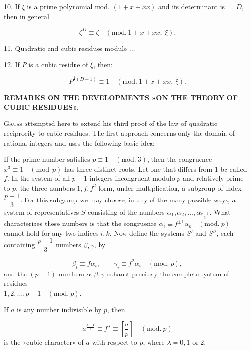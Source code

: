 10. If $\xi$ is a prime polynomial mod. $(1+x+xx)$ and its determinant is $=D$,
then in general

\[
\zeta^D \equiv \zeta \quad(\mathrm{mod.}\ 1+x+xx,\ \xi).
\]

11. Quadratic and cubic residues modulo $\ldots$

12. If $P$ is a cubic residue of $\xi$, then:

\[
P^{\frac{1}{3}(D-1)} \equiv 1 \quad(\mathrm{mod.}\ 1+x+xx,\ \xi).
\]



\begingroup\small
\begin{center}
\textbf{REMARKS ON THE DEVELOPMENTS »ON THE THEORY OF CUBIC} 
\textbf{RESIDUES«.}
\end{center}
\noindent\hspace*{\parindent}\textsc{Gauss} attempted here to extend his third proof of
the law of quadratic reciprocity to cubic residues. The first approach concerns
only the domain of rational integers and uses the following basic idea:

If the prime number satisfies $p \equiv 1 \quad(\mathrm{mod.}\ 3)$, then the congruence $x^3 \equiv 1
\quad(\mathrm{mod.}\ p)$
has three distinct roots. Let one that differs from $1$ be called $f$.
In the system of all $p-1$ integers incongruent modulo $p$ and relatively prime to
$p$, the three numbers $1, f, f^2$ form, under multiplication, a subgroup of index
$\dfrac{p-1}{3}$. For this subgroup we may choose, in any of the many possible ways, a system of
representatives $S$ consisting of the numbers $\alpha_1, \alpha_2,
\ldots, \alpha_{\frac{p-1}{3}}$. What characterizes these
numbers is that the congruence $\alpha_i \equiv f^{\pm1}\alpha_k
\quad(\mathrm{mod.}\ p)$ cannot hold for any two indices $i, k$.
Now define the systems $S'$ and $S''$, each containing $\dfrac{p-1}{3}$ numbers
$\beta, \gamma$, by

\[
\beta_i \equiv f\alpha_i, \qquad \gamma_i \equiv f^2\alpha_i \quad(\mathrm{mod.}\ p),
\]
\noindent and the $(p-1)$ numbers $\alpha, \beta, \gamma$ exhaust precisely the complete
system of residues\hfill\\
$1, 2, \ldots, {p-1} \quad(\mathrm{mod.}\ p)$.

If $a$ is any number indivisible by $p$, then

\[
a^{\frac{p-1}{3}} \equiv f^{\lambda} \equiv \left[\frac{a}{p}\right] \quad(\mathrm{mod.}\ p)
\]
\noindent is the »cubic character« of $a$ with respect to $p$, where
$\lambda = 0, 1$ or $2$.


